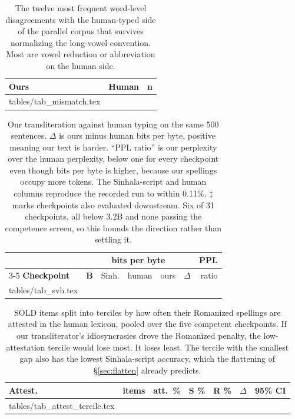 \documentclass{article}
\makeatletter
\newcommand{\rows}[1]{\@@input #1 }
\makeatother
\begin{document}
\begin{table}[t]
\caption{The twelve most frequent word-level disagreements with the human-typed side
of the parallel corpus that survives normalizing the long-vowel convention. Most are
vowel reduction or abbreviation on the human side.}
\label{tab:mismatch}
\centering\small
\begin{tabular}{@{}llr@{}}
\toprule
\textbf{Ours} & \textbf{Human} & \textbf{n} \\
\midrule
\rows{tables/tab_mismatch.tex}
\bottomrule
\end{tabular}
\end{table}

\begin{table}[t]
\caption{Our transliteration against human typing on the same 500 sentences.
$\Delta$ is ours minus human bits per byte, positive meaning our text is harder.
``PPL ratio'' is our perplexity over the human perplexity, below one for every
checkpoint even though bits per byte is higher, because our spellings occupy more
tokens. The Sinhala-script and human columns reproduce the recorded run to within
0.11\%. $\ddagger$ marks checkpoints also evaluated downstream. Six of 31
checkpoints, all below 3.2B and none passing the competence screen, so this bounds
the direction rather than settling it.}
\label{tab:svh}
\centering\scriptsize
\setlength{\tabcolsep}{2.6pt}
\begin{tabular}{@{}lr rrr rr@{}}
\toprule
& & \multicolumn{3}{c}{\textbf{bits per byte}} & & \textbf{PPL} \\
\cmidrule(lr){3-5}
\textbf{Checkpoint} & \textbf{B} & Sinh. & human & ours
& \boldmath$\Delta$ & ratio \\
\midrule
\rows{tables/tab_svh.tex}
\bottomrule
\end{tabular}
\end{table}

\begin{table}[t]
\caption{SOLD items split into terciles by how often their Romanized spellings are
attested in the human lexicon, pooled over the five competent checkpoints. If our
transliterator's idiosyncrasies drove the Romanized penalty, the low-attestation
tercile would lose most. It loses least. The tercile with the smallest gap also has
the lowest Sinhala-script accuracy, which the flattening of \S\ref{sec:flatten}
already predicts.}
\label{tab:attesttercile}
\centering\small
\setlength{\tabcolsep}{2.8pt}
\begin{tabular}{@{}lrr rrr l@{}}
\toprule
\textbf{Attest.} & \textbf{items} & \textbf{att.\ \%}
& \textbf{S \%} & \textbf{R \%} & \boldmath$\Delta$ & \textbf{95\% CI} \\
\midrule
\rows{tables/tab_attest_tercile.tex}
\bottomrule
\end{tabular}
\end{table}
\end{document}
